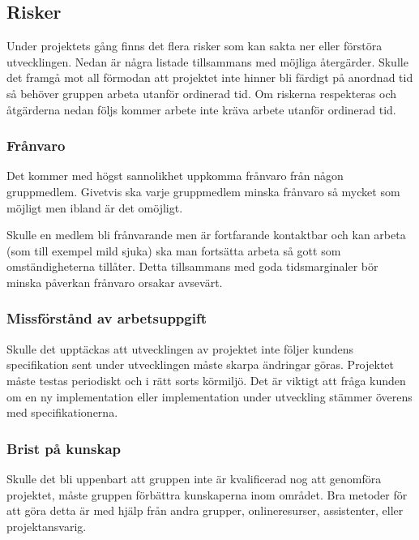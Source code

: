 \documentclass{liu_mall}
\begin{document}
    \subsection{Risker}
        Under projektets gång finns det flera risker som kan sakta ner eller förstöra utvecklingen. Nedan är några listade tillsammans med möjliga återgärder. Skulle det framgå mot all förmodan att projektet inte hinner bli färdigt på anordnad tid så behöver gruppen arbeta utanför ordinerad tid. Om riskerna respekteras och åtgärderna nedan följs kommer arbete inte kräva arbete utanför ordinerad tid.
        
        \subsubsection{Frånvaro}
            Det kommer med högst sannolikhet uppkomma frånvaro från någon gruppmedlem. Givetvis ska varje gruppmedlem minska frånvaro så mycket som möjligt men ibland är det omöjligt.

            Skulle en medlem bli frånvarande men är fortfarande kontaktbar och kan arbeta (som till exempel mild sjuka) ska man fortsätta arbeta så gott som omständigheterna tillåter. Detta tillsammans med goda tidsmarginaler bör minska påverkan frånvaro orsakar avsevärt.
            
        \subsubsection{Missförstånd av arbetsuppgift}
            Skulle det upptäckas att utvecklingen av projektet inte följer kundens specifikation sent under utvecklingen måste skarpa ändringar göras. Projektet måste testas periodiskt och i rätt sorts körmiljö. Det är viktigt att fråga kunden om en ny implementation eller implementation under utveckling stämmer överens med specifikationerna. 
            
        \subsubsection{Brist på kunskap}
            Skulle det bli uppenbart att gruppen inte är kvalificerad nog att genomföra projektet, måste gruppen förbättra kunskaperna inom området. Bra metoder för att göra detta är med hjälp från andra grupper, onlineresurser, assistenter, eller projektansvarig.            
  
\end{document}
